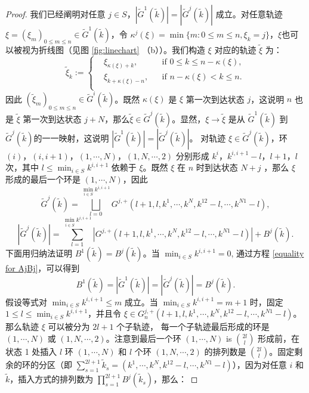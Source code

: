 \begin{proof}
    我们已经阐明对任意 $j\in S$，$|\tilde{G}^1(\tilde{k})|=|\tilde{G}^j(\tilde{k})|$ 成立。对任意轨迹 $\xi=(\xi_m)_{0\le m\le n}\in \tilde{G}^{1}(\tilde{k})$，令 $\kappa^j(\xi)=\min\{m: 0\le m\le n,\xi_k=j\}$，$\xi$也可以被视为折线图（见图 \ref{fig:linechart} （b））。我们构造 $\xi$ 对应的轨迹 $\tilde{\xi}$ 为：
    \begin{equation*}
		\tilde{\xi}_k
		:=\left\{\begin{aligned}
			&\xi_{\kappa(\xi)+k},    && \text{if } 0\le k\le n-\kappa(\xi),\\
			&\xi_{k+\kappa(\xi)-n},    && \text{if }n-\kappa(\xi)<k\le n.\\
		\end{aligned}\right.
	\end{equation*}
    因此 $(\tilde{\xi}_m)_{0\le m\le n} \in \tilde{G}^i(\tilde{k})$。既然 $\kappa(\xi)$ 是 $\xi$ 第一次到达状态 $j$，这说明 $n$ 也是 $\tilde{\xi}$ 第一次到达状态 $j+N$，那么$\tilde{\xi}\in \tilde{G}^j(\tilde{k})$。显然，$\xi\to\tilde{\xi}$ 是从 $\tilde{G}^1(\tilde{k})$ 到 $\tilde{G}^j(\tilde{k})$的一一映射，这说明 $|\tilde{G}^1(\tilde{k})|=|\tilde{G}^j(\tilde{k})|$。
    对轨迹 $\xi\in\tilde{G}^j(\tilde{k})$，环 $(i)$，$(i,i+1)$，$(1,\cdots,N)$，$(1,N,\cdots,2)$ 分别形成 $k^i$，$k^{i,i+1}-l$，$l+1$，$l$ 次，其中 $l\le \min_{i\in S}k^{i,i+1}$ 依赖于 $\xi$。既然 $\xi$ 在 $n$ 时到达状态 $N+j$ ，那么 $\xi$ 形成的最后一个环是 $(1,\cdots,N)$，因此
	\begin{equation*}
		\tilde{G}^j\left(\tilde{k}\right)=\bigsqcup_{l=0}^{\min_{i\in S}k^{i,i+1}}G^{j,+}\left(l+1,l,k^1,\cdots,k^N,k^{12}-l,\cdots,k^{N1}-l\right),
	\end{equation*}
	\begin{equation}\label{equality for AjBj}
		\left|\tilde{G}^j\left(\tilde{k}\right)\right|=\sum_{l=1}^{\min_{i\in S}k^{i,i+1}}\left|G^{j,+}\left(l+1,l,k^1,\cdots,k^N,k^{12}-l,\cdots,k^{N1}-l\right)\right|+B^j\left(\tilde{k}\right).
	\end{equation}
	下面用归纳法证明 $B^1(\tilde{k})=B^j(\tilde{k})$。当 $\min_{i\in S}k^{i,i+1}=0$, 通过方程 \eqref{equality for AjBj}，可以得到 
    \begin{equation*}
		B^1(\tilde{k})=|\tilde{G}^1(\tilde{k})|=|\tilde{G}^j(\tilde{k})|=B^j(\tilde{k}).
	\end{equation*} 
	假设等式对 $\min_{i\in S}k^{i,i+1}\le m$ 成立。当 $\min_{i\in S}k^{i,i+1}=m+1$ 时，固定 $1\le l\le \min_{i\in S}k^{i,i+1}$，并且令 $\xi\in G^{j,+}_n(l+1,l,k^1,\cdots,k^N,k^{12}-l,\cdots,k^{N1}-l)$。那么轨迹 $\xi$ 可以被分为 $2l+1$ 个子轨迹， 每一个子轨迹最后形成的环是 $(1,\cdots,N)$ 或 $(1,N,\cdots,2)$。注意到最后一个环 $(1,\cdots,N)$ is $\binom{2l}{l}$ 形成前，在状态 1 处插入 $l$ 环 $(1,\cdots,N)$ 和 $l$ 个环 $(1,N,\cdots,2)$ 的排列数是 $\binom{2l}{l}$。固定剩余的环的分区（即 $\sum_{s=1}^{2l+1}\tilde{k}_s=(k^1,\cdots,k^N,k^{12}-l,\cdots,k^{N1}-l)$），因为对任意 $i$ 和 $\tilde{k}$，插入方式的排列数为 $\prod_{s=1}^{2l+1}B^j(\tilde{k}_s)$，那么：

\end{proof}
